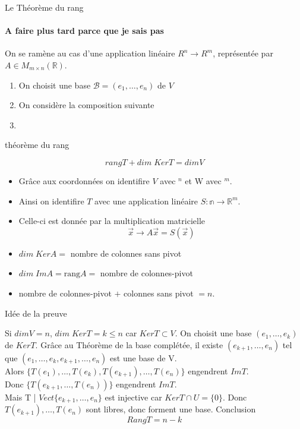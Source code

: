 \begin{parag}{Le Théorème du rang}
    



\paragraph{A faire plus tard parce que je sais pas}
    On se ramène au cas d'une application linéaire $R^n \to R^m$, représentée par $A \in M_{m\times n}\left(\mathbb{R} \right)$.
    \begin{enumerate}
        \item On choisit une base $\mathcal{B} = \left(e_1, \dots, e_n\right)$ de $V$
        \item On considère la composition suivante
 \item     \end{enumerate}


\begin{theoreme}{théorème du rang}
    
        \[rangT + dim\; KerT  = dimV\]
    
\end{theoreme}
\begin{itemize}
    \item Grâce aux coordonnées on identifire $V$ avec \R$^n$ et W avec \R$^m$.
    \item Ainsi on identifire $T$ avec une application linéaire $S: \mathbb{n} \to \mathbb{R}^m$.
    \item Celle-ci est donnée par la multiplication matricielle \[\vec{x} \to A\vec{x} = S\left(\vec{x}\right)\]
    \item $dim \; KerA = $ nombre de colonnes sans pivot
    \item $dim \; ImA = \text{rang}A = $ nombre de colonnes-pivot
    \item  nombre de colonnes-pivot $+$ colonnes sans pivot $= n$.
\end{itemize}

\begin{subparag}{Idée de la preuve}
    

Si $dim V = n$, $dim \; KerT = k \leq n$ car $KerT \subset V$. On choisit une base $\left(e_1, \dots, e_k\right)$ de $KerT$. Grâce au Théorème de la base complétée, il existe $\left(e_{k+1}, \dots, e_n\right)$  tel que $\left(e_1, \dots, e_k, e_{k+1}, \dots, e_n\right) $ est une base de V. 
\\
Alors $\{T\left(e_1\right), \dots, T\left(e_k\right), T\left(e_{k+1}\right), \dots, T\left(e_n\right)\}$ engendrent $ImT$.
\\
Donc $\{T\left(e_{k+1}, \dots, T\left(e_n\right)\right)\}$ engendrent $ImT$.
\\
Mais T | $Vect\{e_{k+1}, \dots, e_n\}$ est injective car $KerT \cap U = \{0\}$.
Donc $T\left(e_{k+1}\right), \dots, T\left(e_n\right)$ sont libres, donc forment une base. Conclusion \[RangT  = n - k\]
\end{subparag}



\end{parag}
